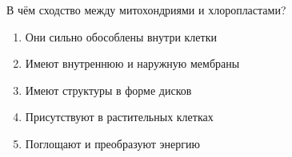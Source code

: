 
В чём сходство между
митохондриями и хлоропластами?

\begin{enumerate}
    \item Они сильно обособлены внутри клетки
    \item Имеют внутреннюю и наружную мембраны
    \item Имеют структуры в форме дисков
    \item Присутствуют в растительных клетках
    \item Поглощают и преобразуют энергию
\end{enumerate}

\explanationSection

